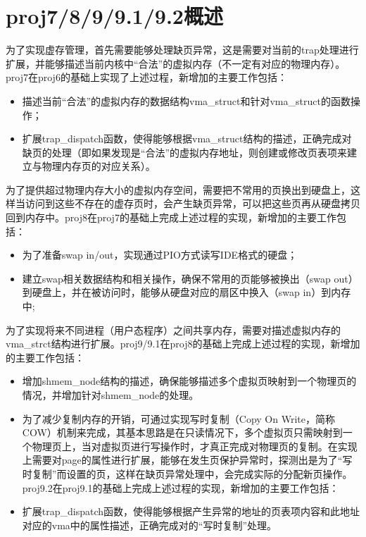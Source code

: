 \section{proj7/8/9/9.1/9.2概述}\label{proj7899.19.2ux6982ux8ff0}

为了实现虚存管理，首先需要能够处理缺页异常，这是需要对当前的trap处理进行扩展，并能够描述当前内核中``合法''的虚拟内存（不一定有对应的物理内存）。proj7在proj6的基础上实现了上述过程，新增加的主要工作包括：

\begin{itemize}
\item
  描述当前``合法''的虚拟内存的数据结构vma\_struct和针对vma\_struct的函数操作；
\item
  扩展trap\_dispatch函数，使得能够根据vma\_struct结构的描述，正确完成对缺页的处理（即如果发现是``合法''的虚拟内存地址，则创建或修改页表项来建立与物理内存页的对应关系）。
\end{itemize}

为了提供超过物理内存大小的虚拟内存空间，需要把不常用的页换出到硬盘上，这样当访问到这些不存在的虚存页时，会产生缺页异常，可以把这些页再从硬盘拷贝回到内存中。proj8在proj7的基础上完成上述过程的实现，新增加的主要工作包括：

\begin{itemize}
\item
  为了准备swap in/out，实现通过PIO方式读写IDE格式的硬盘；
\item
  建立swap相关数据结构和相关操作，确保不常用的页能够被换出（swap
  out）到硬盘上，并在被访问时，能够从硬盘对应的扇区中换入（swap
  in）到内存中;
\end{itemize}

为了实现将来不同进程（用户态程序）之间共享内存，需要对描述虚拟内存的vma\_strct结构进行扩展。proj9/9.1在proj8的基础上完成上述过程的实现，新增加的主要工作包括：

\begin{itemize}
\item
  增加shmem\_node结构的描述，确保能够描述多个虚拟页映射到一个物理页的情况，并增加针对shmem\_node的处理。
\item
  为了减少复制内存的开销，可通过实现写时复制（Copy On
  Write，简称COW）机制来完成，其基本思路是在只读情况下，多个虚拟页只需映射到一个物理页上，当对虚拟页进行写操作时，才真正完成对物理页的复制。在实现上需要对page的属性进行扩展，能够在发生页保护异常时，探测出是为了``写时复制''而设置的页，这样在缺页异常处理中，会完成实际的分配新页操作。proj9.2在proj9.1的基础上完成上述过程的实现，新增加的主要工作包括：
\item
  扩展trap\_dispatch函数，使得能够根据产生异常的地址的页表项内容和此地址对应的vma中的属性描述，正确完成对的``写时复制''处理。
\end{itemize}
